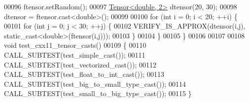 \begin{DoxyCode}
00096   ftensor.setRandom();
00097   \hyperlink{class_eigen_1_1_tensor}{Tensor<double, 2>} dtensor(20, 30);
00098   dtensor = ftensor.cast<\textcolor{keywordtype}{double}>();
00099 
00100   \textcolor{keywordflow}{for} (\textcolor{keywordtype}{int} i = 0; i < 20; ++i) \{
00101     \textcolor{keywordflow}{for} (\textcolor{keywordtype}{int} j = 0; j < 30; ++j) \{
00102       VERIFY\_IS\_APPROX(dtensor(i,j), static\_cast<double>(ftensor(i,j)));
00103     \}
00104   \}
00105 \}
00106 
00107 
00108 \textcolor{keywordtype}{void} test\_cxx11\_tensor\_casts()
00109 \{
00110    CALL\_SUBTEST(test\_simple\_cast());
00111    CALL\_SUBTEST(test\_vectorized\_cast());
00112    CALL\_SUBTEST(test\_float\_to\_int\_cast());
00113    CALL\_SUBTEST(test\_big\_to\_small\_type\_cast());
00114    CALL\_SUBTEST(test\_small\_to\_big\_type\_cast());
00115 \}
\end{DoxyCode}
